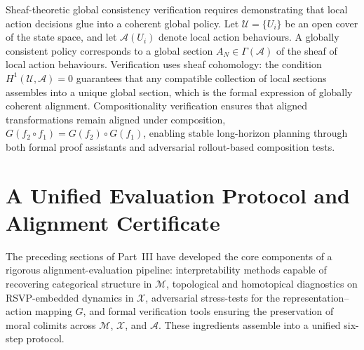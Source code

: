 \documentclass[12pt]{article}
\theoremstyle{definition}
\begin{document}
Sheaf-theoretic global consistency verification requires demonstrating that
local action decisions glue into a coherent global policy. Let $\mathcal{U} =
\{U_i\}$ be an open cover of the state space, and let $\mathcal{A}(U_i)$ denote
local action behaviours. A globally consistent policy corresponds to a global
section $A_N \in \Gamma(\mathcal{A})$ of the sheaf of local action behaviours.
Verification uses sheaf cohomology: the condition $H^1(\mathcal{U}, \mathcal{A})
= 0$ guarantees that any compatible collection of local sections assembles into
a unique global section, which is the formal expression of globally coherent
alignment. Compositionality verification ensures that aligned transformations
remain aligned under composition, $G(f_2 \circ f_1) = G(f_2) \circ G(f_1)$,
enabling stable long-horizon planning through both formal proof assistants and
adversarial rollout-based composition tests.

\section{A Unified Evaluation Protocol and Alignment Certificate}

The preceding sections of Part~III have developed the core components of a
rigorous alignment-evaluation pipeline: interpretability methods capable of
recovering categorical structure in $\mathcal{M}$, topological and homotopical
diagnostics on RSVP-embedded dynamics in $\mathcal{X}$, adversarial stress-tests
for the representation--action mapping $G$, and formal verification tools
ensuring the preservation of moral colimits across $\mathcal{M}$, $\mathcal{X}$,
and $\mathcal{A}$. These ingredients assemble into a unified six-step protocol.
\end{document}
